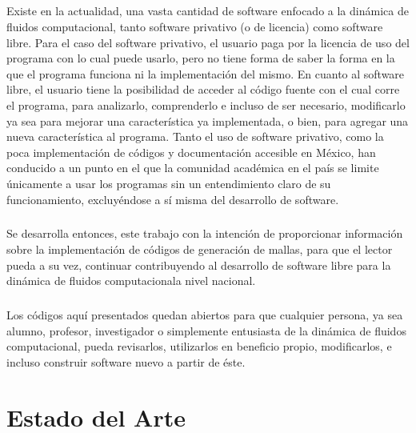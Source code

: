\documentclass[letterpaper, openright, 12pt]{book}
\begin{document}
    \paragraph*{}
        Existe en la actualidad, una vasta cantidad de software enfocado a la
        dinámica de fluidos computacional, tanto software privativo (o de
        licencia) como software libre. Para el caso del software privativo, el
        usuario paga por la licencia de uso del programa con lo cual puede
        usarlo, pero no tiene forma de saber la forma en la que el programa
        funciona ni la implementación del mismo. En cuanto al software libre,
        el usuario tiene la posibilidad de acceder al código fuente con el cual
        corre el programa, para analizarlo, comprenderlo e incluso de ser
        necesario, modificarlo ya sea para mejorar una característica ya
        implementada, o bien, para agregar una nueva característica al programa.
        Tanto el uso de software privativo, como la poca implementación de
        códigos y documentación accesible en México, han conducido a un punto en
        el que la comunidad académica en el país se limite únicamente a usar los
        programas sin un entendimiento claro de su funcionamiento, excluyéndose
        a sí misma del desarrollo de software.
    \paragraph*{}
        Se desarrolla entonces, este trabajo con la intención de proporcionar
        información sobre la implementación de códigos de generación de mallas,
        para que el lector pueda a su vez, continuar contribuyendo al desarrollo
        de software libre para la dinámica de fluidos computacionala nivel
        nacional.

    \paragraph*{}
        Los códigos aquí presentados quedan abiertos para que cualquier persona,
        ya sea alumno, profesor, investigador o  simplemente entusiasta de la
        dinámica de fluidos computacional, pueda revisarlos, utilizarlos en
        beneficio propio, modificarlos, e incluso construir software nuevo a
        partir de éste.

	\chapter{Estado del Arte}
\end{document}
